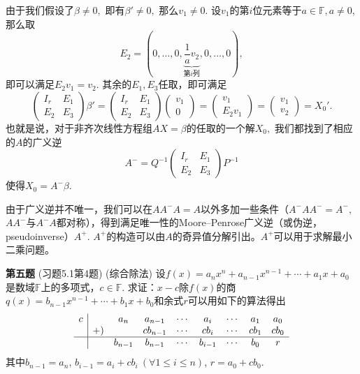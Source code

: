由于我们假设了$\beta \neq 0,$ 即有$\beta' \neq 0,$ 那么$v_1 \neq 0$. 设$v_1$的第$i$位元素等于$a \in \mathbb{F}, a \neq 0,$ 那么取
$$E_2 = (0, \ldots, 0, \underbrace{\dfrac{1}{a}v_2}_{\text{第$i$列}}, 0, \ldots, 0),$$
即可以满足$E_2v_1 = v_2.$ 其余的$E_1, E_3$任取，即可满足
$$\begin{pmatrix} I_r & E_1 \\ E_2 & E_3 \end{pmatrix} \beta' = \begin{pmatrix} I_r & E_1 \\ E_2 & E_3 \end{pmatrix} \begin{pmatrix} v_1 \\ 0 \end{pmatrix} = \begin{pmatrix} v_1 \\ E_2v_1 \end{pmatrix} = \begin{pmatrix} v_1 \\ v_2 \end{pmatrix} = X_0'.$$
也就是说，对于非齐次线性方程组$AX = \beta$的任取的一个解$X_0,$ 我们都找到了相应的$A$的广义逆
$$A^- = Q^{-1} \begin{pmatrix} I_r & E_1 \\ E_2 & E_3 \end{pmatrix} P^{-1}$$
使得$X_0 = A^-\beta.$

\vspace{1em}

由于广义逆并不唯一，我们可以在$AA^-A = A$以外多加一些条件（$A^-AA^- = A^-,$ $AA^-$与$A^-A$都对称），得到满足唯一性的Moore–Penrose广义逆（或伪逆，pseudoinverse）$A^+.$ $A^+$的构造可以由$A$的奇异值分解引出。$A^+$可以用于求解最小二乘问题。

\fi  %

\newpageorvspace

{\bf 第五题} (习题5.1第4题) (综合除法) 设$f(x) = a_nx^n + a_{n-1}x^{n-1} + \cdots + a_1x + a_0$是数域$\mathbb{F}$上的多项式，$c\in\mathbb{F}$. 求证：$x-c$除$f(x)$的商$q(x) = b_{n-1}x^{n-1} + \cdots + b_1x + b_0$和余式$r$可以用如下的算法得出
$$
\begin{array}{c|cccccccc}
c & & a_n & a_{n-1} & \cdots & a_i & \cdots & a_1 & a_0 \\
& +) & & cb_{n-1} & \cdots & cb_i & \cdots & cb_1 & cb_0 \\ \hline
& & b_{n-1} & b_{n-1} & \cdots & b_{i-1} & \cdots & b_0 & r
\end{array}
$$
其中$b_{n-1} = a_n$, $b_{i-1} = a_i + cb_i \ (\forall 1 \leqslant i \leqslant n)$, $r = a_0 + cb_0$.

